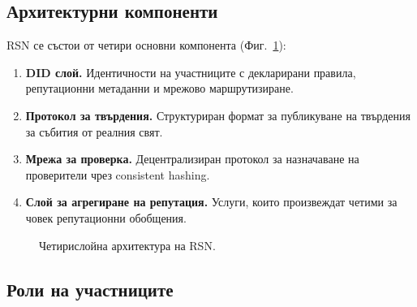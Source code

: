 \documentclass[11pt,a4paper,twocolumn]{article}
\begin{document}
\subsection{Архитектурни компоненти}

RSN се състои от четири основни компонента (Фиг.~\ref{fig:architecture}):
\begin{enumerate}[nosep]
\item \textbf{DID слой.} Идентичности на участниците с декларирани правила, репутационни метаданни и мрежово маршрутизиране.
\item \textbf{Протокол за твърдения.} Структуриран формат за публикуване на твърдения за събития от реалния свят.
\item \textbf{Мрежа за проверка.} Децентрализиран протокол за назначаване на проверители чрез consistent hashing.
\item \textbf{Слой за агрегиране на репутация.} Услуги, които произвеждат четими за човек репутационни обобщения.
\end{enumerate}

\begin{figure}[ht]
\centering
{}
\caption{Четирислойна архитектура на RSN.}
\label{fig:architecture}
\end{figure}

\subsection{Роли на участниците}
\end{document}
